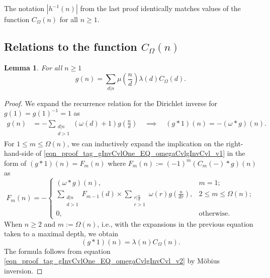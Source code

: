 \documentclass[11pt,reqno,a4letter]{article}
\numberwithin{equation}{section}
\numberwithin{figure}{section}
\numberwithin{table}{section}
\theoremstyle{plain}
\newtheorem{lemma}[theorem]{Lemma}
\numberwithin{theorem}{section}
\theoremstyle{definition}
\begin{document}
The notation $|h^{-1}(n)|$ from the last proof identically matches  
values of the function $C_{\Omega}(n)$ for all $n \geq 1$. 

\subsection{Relations to the function $C_{\Omega}(n)$} 
\label{Section_InvFunc_PreciseExpsAndAsymptotics} 
\label{subSection_Relating_CknFuncs_to_gInvn} 

\begin{lemma} 
\label{lemma_AnExactFormulaFor_gInvByMobiusInv_v1} 
For all $n \geq 1$ 
\[
g(n) = \sum_{d|n} \mu\left(\frac{n}{d}\right) \lambda(d) C_{\Omega}(d). 
\]
\end{lemma}
\begin{proof} 
We expand the recurrence relation for the Dirichlet inverse 
for $g(1) = g(1)^{-1} = 1$ as 
\begin{align} 
\label{eqn_proof_tag_gInvCvlOne_EQ_omegaCvlgInvCvl_v1} 
g(n) & = - \sum_{\substack{d|n \\ d>1}} (\omega(d) + 1) g\left(\frac{n}{d}\right) 
     \quad\implies\quad 
     (g \ast 1)(n) = -(\omega \ast g)(n). 
\end{align} 
For $1 \leq m \leq \Omega(n)$, we can inductively expand the 
implication on the right-hand-side of \eqref{eqn_proof_tag_gInvCvlOne_EQ_omegaCvlgInvCvl_v1} 
in the form of $(g \ast 1)(n) = F_m(n)$ where 
$F_m(n) := (-1)^{m} (C_m(-) \ast g)(n)$ as 
\[
F_m(n) = - 
     \begin{cases} 
     (\omega \ast g)(n), & m = 1; \\ 
     \sum\limits_{\substack{d|n \\ d > 1}} F_{m-1}(d) \times \sum\limits_{\substack{r|\frac{n}{d} \\ r > 1}} 
     \omega(r) g\left(\frac{n}{dr}\right), & 2 \leq m \leq \Omega(n); \\ 
     0, & \text{otherwise.} 
     \end{cases} 
\]
When $n \geq 2$ and $m := \Omega(n)$, i.e., with the expansions 
in the previous equation taken to a maximal depth, we obtain 
\begin{equation} 
\label{eqn_proof_tag_gInvCvlOne_EQ_omegaCvlgInvCvl_v2} 
(g \ast 1)(n) = \lambda(n) C_{\Omega}(n). 
\end{equation} 
The formula follows from equation \eqref{eqn_proof_tag_gInvCvlOne_EQ_omegaCvlgInvCvl_v2} 
by M\"obius inversion. 
\end{proof} 
\end{document}
